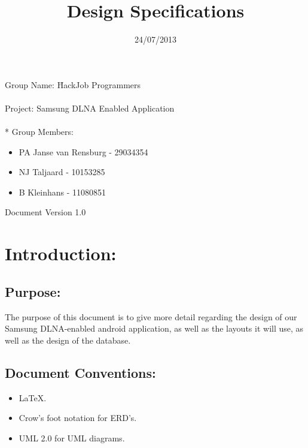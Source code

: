 \documentclass[12pt]{article}
\title{Design Specifications}
\date{24/07/2013}
\begin{document}
  \maketitle
\begin{tabbing}
Group Name: \= HackJob Programmers
\\~
\\Project: Samsung DLNA Enabled Application
\\~
  \\* Group Members:
\end{tabbing}
	
	\begin{itemize}
	\item PA Janse van Rensburg - 29034354
	\item NJ Taljaard - 10153285
	\item B Kleinhans - 11080851
	\end{itemize}

Document Version 1.0

\newpage
\section{Introduction:}
\subsection{Purpose:}
The purpose of this document is to give more detail regarding the design of our Samsung DLNA-enabled android application, as well as the layouts it will use, as well as the design of the database.
\subsection{Document Conventions:}
\begin{itemize}
\item LaTeX.
\item Crow's foot notation for ERD's.
\item UML 2.0 for UML diagrams.
\end{itemize}
\end{document}
